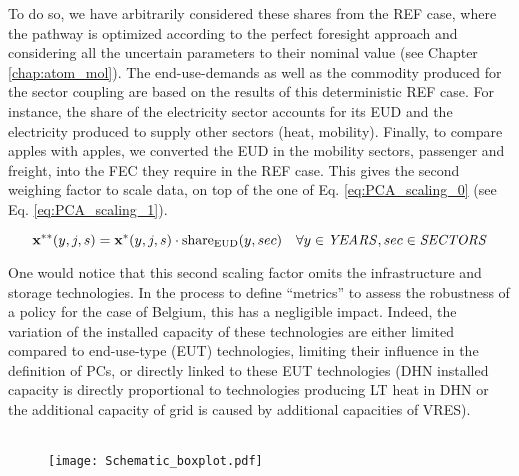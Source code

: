 To do so, we have arbitrarily considered these shares from the REF case, where the pathway is optimized according to the perfect foresight approach and considering all the uncertain parameters to their nominal value (see Chapter \ref{chap:atom_mol}).  The end-use-demands as well as the commodity produced for the sector coupling are based on the results of this deterministic REF case.  For instance, the share of the electricity sector accounts for its \gls{EUD} and the electricity produced to supply other sectors (\eg heat, mobility). Finally, to compare apples with apples, we converted the \gls{EUD} in the mobility sectors, \ie passenger and freight, into the \gls{FEC} they require in the REF case. This gives the second weighing factor to scale data, on top of the one of Eq. \ref{eq:PCA_scaling_0} (see Eq. \ref{eq:PCA_scaling_1}).

\begin{equation}
 \label{eq:PCA_scaling_1}
\textbf{x}^{**}(y,j,s)=\textbf{x}^{*}(y,j,s)\cdot \text{share}_{\text{EUD}}(y,sec)
 \quad \forall y \in \text{\emph{YEARS}}, sec \in \text{\emph{SECTORS}}
\end{equation}

One would notice that this second scaling factor omits the infrastructure and storage technologies. In the process to define ``metrics'' to assess the robustness of a policy for the case of Belgium, this has a negligible impact. Indeed, the variation of the installed capacity of these technologies are either limited compared to end-use-type (EUT) technologies, \ie limiting their influence in the definition of PCs, or directly linked to these EUT technologies (\eg \gls{DHN} installed capacity is directly proportional to technologies producing \gls{LT} heat in \gls{DHN} or the additional capacity of grid is caused by additional capacities of \gls{VRES}). \\

\\

\begin{wrapfigure}{r}{3cm}
\centering
\captionsetup{justification=centering}
\texttt{[image: Schematic\_boxplot.pdf]}
\caption{}
\label{fig:Schematic_boxplot_methodo}
\end{wrapfigure}

